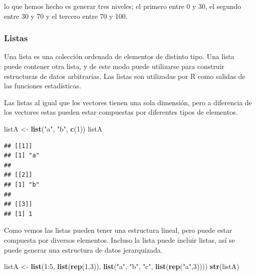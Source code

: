 \documentclass[]{article}
\newenvironment{Shaded}{\begin{snugshade}}{\end{snugshade}}
\newcommand{\KeywordTok}[1]{\textcolor[rgb]{0.13,0.29,0.53}{\textbf{{#1}}}}
\newcommand{\DecValTok}[1]{\textcolor[rgb]{0.00,0.00,0.81}{{#1}}}
\newcommand{\StringTok}[1]{\textcolor[rgb]{0.31,0.60,0.02}{{#1}}}
\newcommand{\NormalTok}[1]{{#1}}
\begin{document}
lo que hemos hecho es generar tres niveles; el primero entre 0 y 30, el
segundo entre 30 y 70 y el tercero entre 70 y 100.

\subsubsection{Listas}\label{listas}

Una lista es una colección ordenada de elementos de distinto tipo. Una
lista puede contener otra lista, y de este modo puede utilizarse para
construir estructuras de datos arbitrarias. Las listas son utilizadas
por R como salidas de las funciones estadísticas.

Las listas al igual que los vectores tienen una sola dimensión, pero a
diferencia de los vectores estas pueden estar compuestas por diferentes
tipos de elementos.

\begin{Shaded}
\begin{Highlighting}[]
\NormalTok{listA <-}\StringTok{ }\KeywordTok{list}\NormalTok{(}\StringTok{"a"}\NormalTok{, }\StringTok{"b"}\NormalTok{, }\KeywordTok{c}\NormalTok{(}\DecValTok{1}\NormalTok{))}
\NormalTok{listA}
\end{Highlighting}
\end{Shaded}

\begin{verbatim}
## [[1]]
## [1] "a"
## 
## [[2]]
## [1] "b"
## 
## [[3]]
## [1] 1
\end{verbatim}

Como vemos las listas pueden tener una estructura lineal, pero puede
estar compuesta por diversos elementos. Incluso la lista puede incluir
listas, así se puede generar una estructura de datos jerarquizada.

\begin{Shaded}
\begin{Highlighting}[]
\NormalTok{listA <-}\StringTok{ }\KeywordTok{list}\NormalTok{(}\DecValTok{1}\NormalTok{:}\DecValTok{5}\NormalTok{, }\KeywordTok{list}\NormalTok{(}\KeywordTok{rep}\NormalTok{(}\DecValTok{1}\NormalTok{,}\DecValTok{3}\NormalTok{)), }\KeywordTok{list}\NormalTok{(}\StringTok{"a"}\NormalTok{, }\StringTok{"b"}\NormalTok{, }\StringTok{"c"}\NormalTok{, }\KeywordTok{list}\NormalTok{(}\KeywordTok{rep}\NormalTok{(}\StringTok{"a"}\NormalTok{,}\DecValTok{3}\NormalTok{))))}
\KeywordTok{str}\NormalTok{(listA)}
\end{Highlighting}
\end{Shaded}
\end{document}

